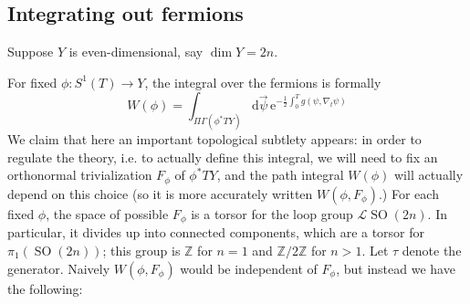 \documentclass[12pt,letterpaper,reqno]{article}
\numberwithin{equation}{section}
\newcommand{\cC}{\ensuremath{\mathcal C}}
\newcommand{\cL}{\ensuremath{\mathcal L}}
\newcommand{\Z}{\ensuremath{\mathbb Z}}
\newcommand{\half}{\ensuremath{\frac{1}{2}}}
\newcommand{\e}{{\mathrm e}}
\newcommand{\de}{\mathrm{d}}
\DeclareMathOperator{\SO}{SO}
\newcommand{\fixme}[1]{{\color{orange}{[#1]}}}
\begin{document}
\subsection{Integrating out fermions} \label{sec:susy-discretization}

\fixme{warning, doing this by discretization seems to be subtle, because
of fermion doubling problem! need to give some explicit way of understanding
the result here}




Suppose $Y$ is even-dimensional, say $\dim Y = 2n$.

For fixed $\phi: S^1(T) \to Y$, the integral over the fermions is formally
\begin{equation}
  W(\phi) = \int_{\Pi \Gamma(\phi^* TY)} \de \vec\psi \, \e^{- \half \int_{0}^T g(\psi, \nabla_t \psi)} 
\end{equation}
We claim that
here an important topological subtlety appears: in order to regulate
the theory, i.e. to actually define this integral, 
we will need to fix an orthonormal
trivialization $F_\phi$ of $\phi^* TY$,
and the path integral $W(\phi)$ will actually depend on this choice
(so it is more accurately written $W(\phi, F_\phi)$.)
For each fixed $\phi$, 
the space of possible $F_\phi$ is a torsor
for the loop group $\cL\SO(2n)$. In particular, it
divides up into connected components, which are a torsor for
$\pi_1(\SO(2n))$; this group is $\Z$ for $n=1$ and $\Z / 2\Z$
for $n>1$. Let $\tau$ denote the generator.
Naively $W(\phi, F_\phi)$ would be independent of $F_\phi$,
but instead we have the following:
\end{document}
